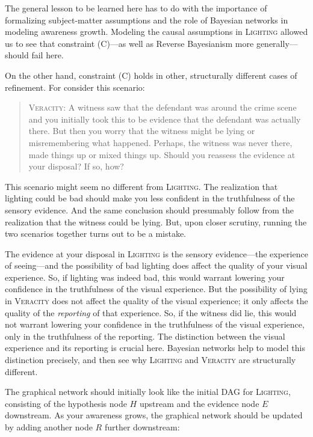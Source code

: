 \documentclass[
  11pt,
  dvipsnames,enabledeprecatedfontcommands]{scrartcl}
\begin{document}
The general lesson to be learned here has to do with the importance of
formalizing subject-matter assumptions and the role of Bayesian networks
in modeling awareness growth. Modeling the causal assumptions in
\textsc{Lighting} allowed us to see that constraint (C)---as well as
Reverse Bayesianism more generally---should fail here.

On the other hand, constraint (C) holds in other, structurally different
cases of refinement. For consider this scenario:

\begin{quote}
\textsc{Veracity}: A witness saw that the defendant was around the crime
scene and you initially took this to be evidence that the defendant was
actually there. But then you worry that the witness might be lying or
misremembering what happened. Perhaps, the witness was never there, made
things up or mixed things up. Should you reassess the evidence at your
disposal? If so, how?
\end{quote}

\doublespace

\noindent   This scenario might seem no different from
\textsc{Lighting}. The realization that lighting could be bad should
make you less confident in the truthfulness of the sensory evidence. And
the same conclusion should presumably follow from the realization that
the witness could be lying. But, upon closer scrutiny, running the two
scenarios together turns out to be a mistake.

The evidence at your disposal in \textsc{Lighting} is the sensory
evidence---the experience of seeing---and the possibility of bad
lighting does affect the quality of your visual experience. So, if
lighting was indeed bad, this would warrant lowering your confidence in
the truthfulness of the visual experience. But the possibility of lying
in \textsc{Veracity} does not affect the quality of the visual
experience; it only affects the quality of the \textit{reporting} of
that experience. So, if the witness did lie, this would not warrant
lowering your confidence in the truthfulness of the visual experience,
only in the truthfulness of the reporting. The distinction between the
visual experience and its reporting is crucial here. Bayesian networks
help to model this distinction precisely, and then see why
\textsc{Lighting} and \textsc{Veracity} are structurally different.

The graphical network should initially look like the initial DAG for
\textsc{Lighting}, consisting of the hypothesis node \(H\) upstream and
the evidence node \(E\) downstream. As your awareness grows, the
graphical network should be updated by adding another node \(R\) further
downstream:
\end{document}
